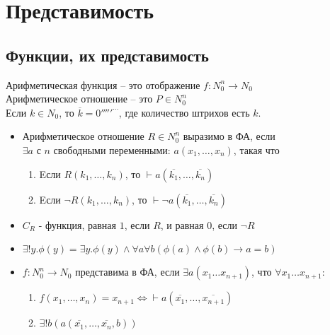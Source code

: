 \section{Представимость}
\label{sec-11}
\subsection{Функции, их представимость}
\label{sec-11-1}
Арифметическая функция -- это отображение $f: N_0^n \to N_0$ \\
Арифметическое отношение -- это $P \in N_0^n$ \\
Если $k \in N_0$, то $\overline k = 0'''''^\cdots$, где количество штрихов есть $k$.
\begin{itemize}
\item Арифметическое отношение $R \in N_0^n$ выразимо в ФА, если\\
$\exists a$ с $n$ свободными переменными:
$a(x_1,\dotsc, x_n)$, такая что
\begin{enumerate}
\item Eсли $R(k_1,\dotsc, k_n)$, то $\vdash a(\overline{k_1}, \dotsc, \overline{k_n})$
\item Eсли $\lnot R(k_1, \dotsc, k_n)$, то $\vdash \lnot a(\overline{k_1}, \dotsc, \overline{k_n})$
\end{enumerate}
\item $C_R$ - функция, равная $1$, если $R$, и равная $0$, если $\lnot R$
\item $\exists !y.\phi(y) = \exists y.\phi(y) \land \forall a\forall b(\phi(a) \land \phi(b) \to a = b)$
\item $f: N_0^n \to N_0$ представима в ФА, если $\exists a(x_1\dots x_{n+1})$, что
$\forall x_1\dotsc x_{n+1}:$
\begin{enumerate}
\item $f(x_1, \dotsc, x_n) = x_{n+1} \Leftrightarrow \vdash a(\overline{x_1}, \dotsc, \overline{x_{n+1}})$
\item $\exists !b(a(\overline{x_1}, \dotsc, \overline{x_n}, b))$
\end{enumerate}
\end{itemize}
